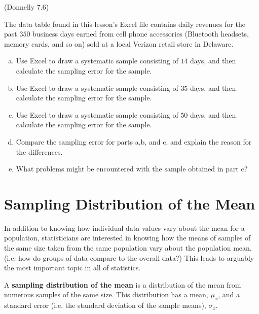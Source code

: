 \documentclass[12pt, letterpaper]{article}
\newcounter{exercise}
\theoremstyle{definition}
\begin{document}
\newpage

\begin{exercise}  (Donnelly 7.6)

The data table found in this lesson's Excel file contains daily revenues for the past $350$ business days earned from cell phone accessories (Bluetooth headsets, memory cards, and so on) sold at a local Verizon retail store in Delaware.

\end{exercise}

\begin{enumerate}[(a)]

\item Use Excel to draw a systematic sample consisting of $14$ days, and then calculate the sampling error for the sample.

\vfill

\item Use Excel to draw a systematic sample consisting of $35$ days, and then calculate the sampling error for the sample.

\vfill

\item Use Excel to draw a systematic sample consisting of $50$ days, and then calculate the sampling error for the sample.

\vfill

\item Compare the sampling error for parts a,b, and c, and explain the reason for the differences.

\vfill

\item What problems might be encountered with the sample obtained in part c?

\vfill

\end{enumerate}


\section*{Sampling Distribution of the Mean}

\noindent In addition to knowing how individual data values vary about the mean for a population, statisticians are interested in knowing how the means of samples of the same size taken from the same population vary about the population mean.  (i.e. how do groups of data compare to the overall data?)  This leads to arguably the most important topic in all of statistics.


\begin{defn}
A \textbf{sampling distribution of the mean} is a distribution of the mean from numerous samples of the same size.  This distribution has a mean, $\mu_{\overline{x}}$, and a standard error (i.e. the standard deviation of the sample means), $\sigma_{\overline{x}}$.
\end{defn}
\end{document}
